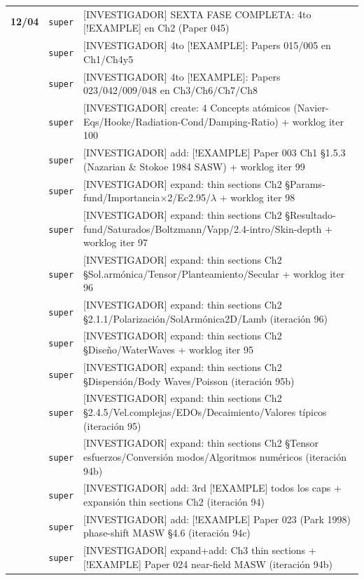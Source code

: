\begin{longtable}{@{}p{1.7cm} p{1.5cm} p{12.2cm}@{}}
\textbf{12/04} & \texttt{\scriptsize super} & [INVESTIGADOR] SEXTA FASE COMPLETA: 4to [!EXAMPLE] en Ch2 (Paper 045) \\
 & \texttt{\scriptsize super} & [INVESTIGADOR] 4to [!EXAMPLE]: Papers 015/005 en Ch1/Ch4y5 \\
 & \texttt{\scriptsize super} & [INVESTIGADOR] 4to [!EXAMPLE]: Papers 023/042/009/048 en Ch3/Ch6/Ch7/Ch8 \\
 & \texttt{\scriptsize super} & [INVESTIGADOR] create: 4 Concepts atómicos (Navier-Eqs/Hooke/Radiation-Cond/Damping-Ratio) + worklog iter 100 \\
 & \texttt{\scriptsize super} & [INVESTIGADOR] add: [!EXAMPLE] Paper 003 Ch1 §1.5.3 (Nazarian \& Stokoe 1984 SASW) + worklog iter 99 \\
 & \texttt{\scriptsize super} & [INVESTIGADOR] expand: thin sections Ch2 §Params-fund/Importancia$\times$2/Ec2.95/$\lambda$ + worklog iter 98 \\
 & \texttt{\scriptsize super} & [INVESTIGADOR] expand: thin sections Ch2 §Resultado-fund/Saturados/Boltzmann/Vapp/2.4-intro/Skin-depth + worklog iter 97 \\
 & \texttt{\scriptsize super} & [INVESTIGADOR] expand: thin sections Ch2 §Sol.armónica/Tensor/Planteamiento/Secular + worklog iter 96 \\
 & \texttt{\scriptsize super} & [INVESTIGADOR] expand: thin sections Ch2 §2.1.1/Polarización/SolArmónica2D/Lamb (iteración 96) \\
 & \texttt{\scriptsize super} & [INVESTIGADOR] expand: thin sections Ch2 §Diseño/WaterWaves + worklog iter 95 \\
 & \texttt{\scriptsize super} & [INVESTIGADOR] expand: thin sections Ch2 §Dispersión/Body Waves/Poisson (iteración 95b) \\
 & \texttt{\scriptsize super} & [INVESTIGADOR] expand: thin sections Ch2 §2.4.5/Vel.complejas/EDOs/Decaimiento/Valores típicos (iteración 95) \\
 & \texttt{\scriptsize super} & [INVESTIGADOR] expand: thin sections Ch2 §Tensor esfuerzos/Conversión modos/Algoritmos numéricos (iteración 94b) \\
 & \texttt{\scriptsize super} & [INVESTIGADOR] add: 3rd [!EXAMPLE] todos los caps + expansión thin sections Ch2 (iteración 94) \\
 & \texttt{\scriptsize super} & [INVESTIGADOR] add: [!EXAMPLE] Paper 023 (Park 1998) phase-shift MASW §4.6 (iteración 94c) \\
 & \texttt{\scriptsize super} & [INVESTIGADOR] expand+add: Ch3 thin sections + [!EXAMPLE] Paper 024 near-field MASW (iteración 94b) \\

\end{longtable}
